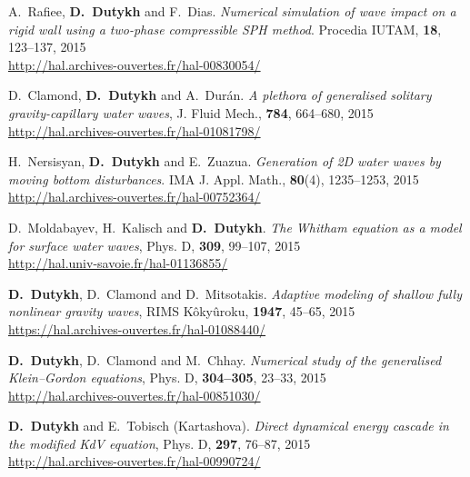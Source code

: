 \begin{etaremune}
  
  \item A.~Rafiee, \textbf{D.~Dutykh} and F.~Dias. \textit{Numerical simulation of wave impact on a rigid wall using a two-phase compressible SPH method}. Procedia IUTAM, \textbf{18}, 123--137, 2015 \\ %
  \url{http://hal.archives-ouvertes.fr/hal-00830054/}

  \item D.~Clamond, \textbf{D.~Dutykh} and A.~Dur\'an. \textit{A plethora of generalised solitary gravity-capillary water waves}, J. Fluid Mech., \textbf{784}, 664--680, 2015 \\ %
  \url{http://hal.archives-ouvertes.fr/hal-01081798/}
  
  \item H.~Nersisyan, \textbf{D.~Dutykh} and E.~Zuazua. \textit{Generation of 2D water waves by moving bottom disturbances}. IMA J. Appl. Math., \textbf{80}(4), 1235--1253, 2015 \\ %
  \url{http://hal.archives-ouvertes.fr/hal-00752364/}
  
  \item D.~Moldabayev, H.~Kalisch and \textbf{D.~Dutykh}. \textit{The Whitham equation as a model for surface water waves}, Phys. D, \textbf{309}, 99--107, 2015 \\ %
  \url{http://hal.univ-savoie.fr/hal-01136855/}
  
  \item \textbf{D.~Dutykh}, D.~Clamond and D.~Mitsotakis. \textit{Adaptive modeling of shallow fully nonlinear gravity waves}, RIMS K\^oky\^uroku, \textbf{1947}, 45--65, 2015 \\ %
  \url{https://hal.archives-ouvertes.fr/hal-01088440/}
  
  \item \textbf{D.~Dutykh}, D.~Clamond and M.~Chhay. \textit{Numerical study of the generalised Klein--Gordon equations}, Phys. D, \textbf{304--305}, 23--33, 2015 \\ %
  \url{http://hal.archives-ouvertes.fr/hal-00851030/}
  
  \item \textbf{D.~Dutykh} and E.~Tobisch (Kartashova). \textit{Direct dynamical energy cascade in the modified KdV equation}, Phys. D, \textbf{297}, 76--87, 2015 \\ %
  \url{http://hal.archives-ouvertes.fr/hal-00990724/}


\end{etaremune}
